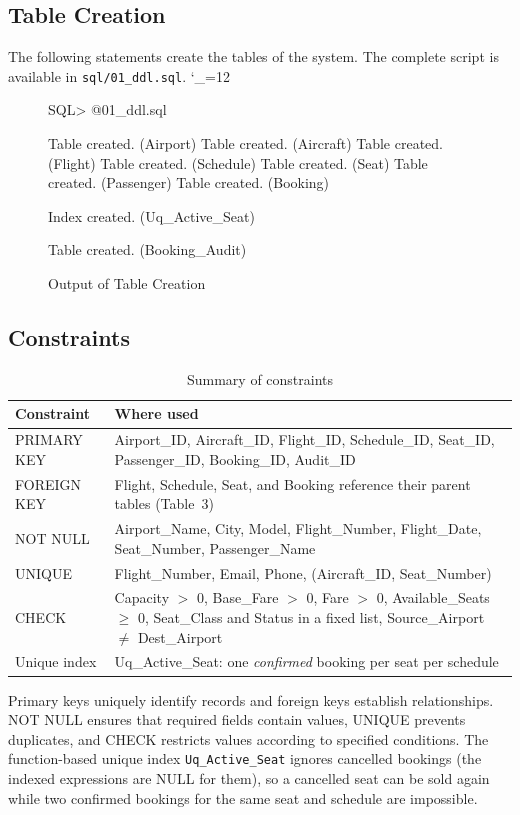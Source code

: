 \documentclass[12pt,a4paper]{article}
\newcommand{\sqlfile}{\begingroup\catcode`\_=12 \sqlfileA}
\newcommand{\sqlfileA}[1]{\endgroup}
\begin{document}
\subsection{Table Creation}
The following statements create the tables of the system. The complete script is available in
\texttt{sql/01\_ddl.sql}.
\sqlfile{01_ddl.sql}

\begin{figure}[H]
\begin{terminal}
SQL> @01_ddl.sql

Table created.   (Airport)
Table created.   (Aircraft)
Table created.   (Flight)
Table created.   (Schedule)
Table created.   (Seat)
Table created.   (Passenger)
Table created.   (Booking)

Index created.   (Uq_Active_Seat)

Table created.   (Booking_Audit)
\end{terminal}
\caption{Output of Table Creation}
\end{figure}

\subsection{Constraints}
\begin{table}[H]
\centering\small
\begin{tabularx}{\textwidth}{l X}
\toprule
\textbf{Constraint} & \textbf{Where used}\\
\midrule
PRIMARY KEY & Airport_ID, Aircraft_ID, Flight_ID, Schedule_ID, Seat_ID, Passenger_ID, Booking_ID, Audit_ID\\
FOREIGN KEY & Flight, Schedule, Seat, and Booking reference their parent tables (Table~3)\\
NOT NULL    & Airport_Name, City, Model, Flight_Number, Flight_Date, Seat_Number, Passenger_Name\\
UNIQUE      & Flight_Number, Email, Phone, (Aircraft_ID, Seat_Number)\\
CHECK       & Capacity $>$ 0, Base_Fare $>$ 0, Fare $>$ 0, Available_Seats $\ge$ 0, Seat_Class and Status in a fixed list, Source_Airport $\ne$ Dest_Airport\\
Unique index & Uq_Active_Seat: one \emph{confirmed} booking per seat per schedule\\
\bottomrule
\end{tabularx}
\caption{Summary of constraints}
\end{table}
Primary keys uniquely identify records and foreign keys establish relationships. NOT NULL ensures that
required fields contain values, UNIQUE prevents duplicates, and CHECK restricts values according to
specified conditions. The function-based unique index \texttt{Uq\_Active\_Seat} ignores cancelled bookings
(the indexed expressions are NULL for them), so a cancelled seat can be sold again while two confirmed
bookings for the same seat and schedule are impossible.
\end{document}
